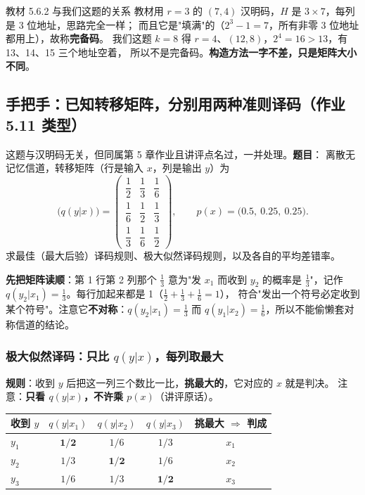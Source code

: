 \begin{idea}{教材 5.6.2 与我们这题的关系}
教材用 $r=3$ 的 $(7,4)$ 汉明码，$H$ 是 $3\times7$，每列是 3 位地址，思路完全一样；
而且它是"填满"的（$2^{3}-1=7$，所有非零 3 位地址都用上），故称\textbf{完备码}。
我们这题 $k=8$ 得 $r=4$、$(12,8)$，$2^{4}=16>13$，有 13、14、15 三个地址空着，
所以不是完备码。\textbf{构造方法一字不差，只是矩阵大小不同}。
\end{idea}

\subsection{手把手：已知转移矩阵，分别用两种准则译码（作业 5.11 类型）}

这题与汉明码无关，但同属第 5 章作业且讲评点名过，一并处理。\textbf{题目}：
离散无记忆信道，转移矩阵（行是输入 $x$，列是输出 $y$）为
\[
\bigl(q(y|x)\bigr)=
\begin{pmatrix}
\dfrac{1}{2}&\dfrac{1}{3}&\dfrac{1}{6}\\[2mm]
\dfrac{1}{6}&\dfrac{1}{2}&\dfrac{1}{3}\\[2mm]
\dfrac{1}{3}&\dfrac{1}{6}&\dfrac{1}{2}
\end{pmatrix},
\qquad
p(x)=\bigl(0.5,\ 0.25,\ 0.25\bigr).
\]
求最佳（最大后验）译码规则、极大似然译码规则，以及各自的平均差错率。

\textbf{先把矩阵读顺}：第 1 行第 2 列那个 $\frac13$ 意为"发 $x_1$ 而收到 $y_2$ 的概率是
$\frac13$"，记作 $q(y_2|x_1)=\frac13$。每行加起来都是 1（$\frac12+\frac13+\frac16=1$），
符合"发出一个符号必定收到某个符号"。注意它\textbf{不对称}：$q(y_2|x_1)=\frac13$ 而
$q(y_1|x_2)=\frac16$，所以不能偷懒套对称信道的结论。

\subsubsection{极大似然译码：只比 $q(y|x)$，每列取最大}

\textbf{规则}：收到 $y$ 后把这一列三个数比一比，\textbf{挑最大的}，它对应的 $x$ 就是判决。
注意：\textbf{只看 $q(y|x)$，不许乘 $p(x)$}（讲评原话）。

\begin{center}\small
\setlength{\tabcolsep}{6pt}
\begin{tabular}{@{}lcccc@{}}
\toprule
收到 $y$ & $q(y|x_1)$ & $q(y|x_2)$ & $q(y|x_3)$ & 挑最大 $\Rightarrow$ 判成\\
\midrule
$y_1$ & $\mathbf{1/2}$ & $1/6$ & $1/3$ & $x_1$\\
$y_2$ & $1/3$ & $\mathbf{1/2}$ & $1/6$ & $x_2$\\
$y_3$ & $1/6$ & $1/3$ & $\mathbf{1/2}$ & $x_3$\\
\bottomrule
\end{tabular}
\end{center}

